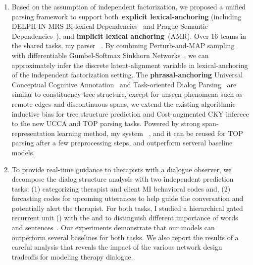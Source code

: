 \begin{enumerate}
\item Based on the assumption of independent factorization, we
  proposed a unified parsing framework to support
  both~\textbf{explicit lexical-anchoring} (including DELPH-IN MRS
  Bi-lexical Dependencies~\citep[DM,][]{ivanova2012did} and Prague
  Semantic
  Dependencies~\citep[PSD,][]{hajic2012announcing,miyao2014house}),
  and \textbf{implicit lexical anchoring}~(AMR). Over 16 teams in the
  shared tasks, my parser~\citep{cao2019amazon} . By combining Perturb-and-MAP
  sampling~\citep{papandreouperturb} with differentiable
  Gumbel-Softmax Sinkhorn Networks~\citep{mena2018learning}, we can
  approximately infer the discrete latent-alignment variable in
  lexical-anchoring of the independent factorization setting. The
  \textbf{phrasal-anchoring} Universal Conceptual Cognitive
  Annotation~\citep[UCCA,][]{abend2013universal} and Task-oriented
  Dialog Parsing~\citep[TOP,][]{gupta-etal-2018-semantic-parsing} are
  similar to constituency tree structure, except for unseen phenomena
  such as remote edges and discontinuous spans, we extend the existing
  algorithmic inductive bias for tree structure prediction and
  Cost-augmented CKY inferece to the new UCCA and TOP parsing
  tasks. Powered by strong span-representation learning method, my
  system~\citep{cao2019amazon} , and
  it can be reused for TOP parsing after a few preprocessing steps,
  and outperform serveral baseline models.

\item To provide real-time guidance to therapists with a dialogue
  observer, we decompose the dialog structure analysis with two
  independent prediction tasks: (1) categorizing therapist and client
  MI behavioral codes and, (2) forcasting codes for upcoming
  utterances to help guide the conversation and potentially alert the
  therapist. For both tasks, I studied a hierarchical gated recurrent
  unit (\HGRU) with the  and
   to distinguish different importance of
  words and sentences~\citep{jie2019psycdialacl}. Our experiments
  demonstrate that our models can outperform several baselines for
  both tasks.  We also report the results of a careful analysis that
  reveals the impact of the various network design tradeoffs for
  modeling therapy dialogue.


\end{enumerate}
